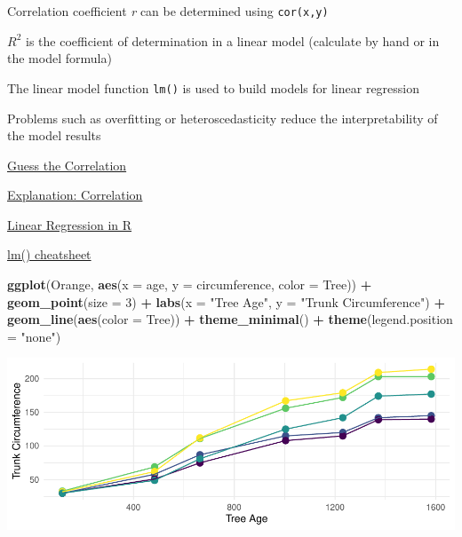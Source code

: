 \documentclass[
]{book}
\newenvironment{Shaded}{\begin{snugshade}}{\end{snugshade}}
\newcommand{\AttributeTok}[1]{\textcolor[rgb]{0.13,0.29,0.53}{#1}}
\newcommand{\DecValTok}[1]{\textcolor[rgb]{0.00,0.00,0.81}{#1}}
\newcommand{\FunctionTok}[1]{\textcolor[rgb]{0.13,0.29,0.53}{\textbf{#1}}}
\newcommand{\NormalTok}[1]{#1}
\newcommand{\SpecialCharTok}[1]{\textcolor[rgb]{0.81,0.36,0.00}{\textbf{#1}}}
\newcommand{\StringTok}[1]{\textcolor[rgb]{0.31,0.60,0.02}{#1}}
\begin{document}
Correlation coefficient \emph{r} can be determined using \texttt{cor(x,y)}

\(R^2\) is the coefficient of determination in a linear model (calculate by hand or in the model formula)

The linear model function \texttt{lm()} is used to build models for linear regression

Problems such as overfitting or heteroscedasticity reduce the interpretability of the model results

\href{https://www.guessthecorrelation.com/}{Guess the Correlation}

\href{https://statisticsbyjim.com/basics/correlation-coefficient-formula/}{Explanation: Correlation}

\href{https://www.datacamp.com/tutorial/linear-regression-R}{Linear Regression in R}

\href{https://www.codecademy.com/learn/learn-linear-regression-in-r/modules/linear-regression-in-r/cheatsheet/}{lm() cheatsheet}

\begin{Shaded}
\begin{Highlighting}[]
\FunctionTok{ggplot}\NormalTok{(Orange, }\FunctionTok{aes}\NormalTok{(}\AttributeTok{x =}\NormalTok{ age, }\AttributeTok{y =}\NormalTok{ circumference, }\AttributeTok{color =}\NormalTok{ Tree)) }\SpecialCharTok{+}
  \FunctionTok{geom\_point}\NormalTok{(}\AttributeTok{size =} \DecValTok{3}\NormalTok{) }\SpecialCharTok{+} \FunctionTok{labs}\NormalTok{(}\AttributeTok{x =} \StringTok{"Tree Age"}\NormalTok{, }\AttributeTok{y =} \StringTok{"Trunk Circumference"}\NormalTok{) }\SpecialCharTok{+}
  \FunctionTok{geom\_line}\NormalTok{(}\FunctionTok{aes}\NormalTok{(}\AttributeTok{color =}\NormalTok{ Tree)) }\SpecialCharTok{+} \FunctionTok{theme\_minimal}\NormalTok{() }\SpecialCharTok{+} \FunctionTok{theme}\NormalTok{(}\AttributeTok{legend.position =} \StringTok{"none"}\NormalTok{)}
\end{Highlighting}
\end{Shaded}

\includegraphics{_main_files/figure-html/orange-pretty-1.pdf}
\end{document}
